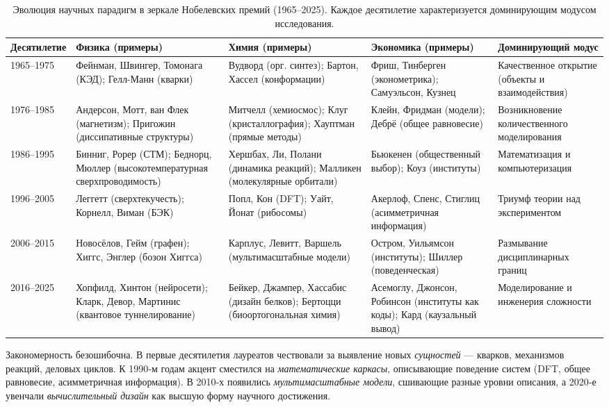 \documentclass[12pt,a4paper]{article}
\begin{document}
	\begin{table}[htbp]
		\centering
		\caption{Эволюция научных парадигм в зеркале Нобелевских премий (1965–2025). Каждое десятилетие характеризуется доминирующим модусом исследования.}
		\label{tab:nobel}
		\small
		\begin{tabular}{p{2.5cm}p{3.5cm}p{3.5cm}p{2.5cm}p{2.8cm}}
			\toprule
			\textbf{Десятилетие} & \textbf{Физика (примеры)} & \textbf{Химия (примеры)} & \textbf{Экономика (примеры)} & \textbf{Доминирующий модус} \\
			\midrule
			1965--1975 & Фейнман, Швингер, Томонага (КЭД); Гелл-Манн (кварки) & Вудворд (орг. синтез); Бартон, Хассел (конформации) & Фриш, Тинберген (эконометрика); Самуэльсон, Кузнец & Качественное открытие (объекты и взаимодействия) \\
			1976--1985 & Андерсон, Мотт, ван Флек (магнетизм); Пригожин (диссипативные структуры) & Митчелл (хемиосмос); Клуг (кристаллография); Хауптман (прямые методы) & Клейн, Фридман (модели); Дебрё (общее равновесие) & Возникновение количественного моделирования \\
			1986--1995 & Бинниг, Рорер (СТМ); Беднорц, Мюллер (высокотемпературная сверхпроводимость) & Хершбах, Ли, Полани (динамика реакций); Малликен (молекулярные орбитали) & Бьюкенен (общественный выбор); Коуз (институты) & Математизация и компьютеризация \\
			1996--2005 & Леггетт (сверхтекучесть); Корнелл, Виман (БЭК) & Попл, Кон (DFT); Уайт, Йонат (рибосомы) & Акерлоф, Спенс, Стиглиц (асимметричная информация) & Триумф теории над экспериментом \\
			2006--2015 & Новосёлов, Гейм (графен); Хиггс, Энглер (бозон Хиггса) & Карплус, Левитт, Варшель (мультимасштабные модели) & Остром, Уильямсон (институты); Шиллер (поведенческая) & Размывание дисциплинарных границ \\
			2016--2025 & Хопфилд, Хинтон (нейросети); Кларк, Девор, Мартинис (квантовое туннелирование) & Бейкер, Джампер, Хассабис (дизайн белков); Бертоцци (биоортогональная химия) & Асемоглу, Джонсон, Робинсон (институты как коды); Кард (каузальный вывод) & Моделирование и инженерия сложности \\
			\bottomrule
		\end{tabular}
	\end{table}
	
	Закономерность безошибочна. В первые десятилетия лауреатов чествовали за выявление новых \emph{сущностей} — кварков, механизмов реакций, деловых циклов. К 1990‑м годам акцент сместился на \emph{математические каркасы}, описывающие поведение систем (DFT, общее равновесие, асимметричная информация). В 2010‑х появились \emph{мультимасштабные модели}, сшивающие разные уровни описания, а 2020‑е увенчали \emph{вычислительный дизайн} как высшую форму научного достижения.
	
\end{document}

